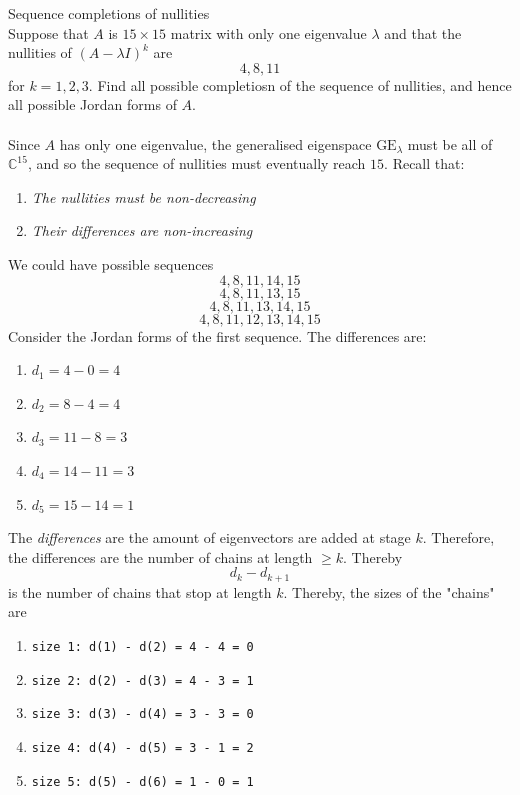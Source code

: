 \documentclass[journal, letterpaper]{IEEEtran}
\begin{document}
    \begin{myboxg}{Sequence completions of nullities} \\
        Suppose that $A$ is $15 \times 15$ matrix with only one eigenvalue $\lambda$ and that the nullities of $(A - \lambda I)^k$ are
        $$ 4, 8, 11$$
        for $k = 1, 2, 3$. Find all possible completiosn of the sequence of nullities, and hence all possible Jordan forms of $A$.
        \\ \\
        Since $A$ has only one eigenvalue, the generalised eigenspace $\text{GE}_\lambda$ must be all of $\mathbb{C}^{15}$, and so the sequence of nullities must eventually reach $15$. Recall that:
        \begin{enumerate}
            \item \textit{The nullities must be non-decreasing}
            \item \textit{Their differences are non-increasing}
        \end{enumerate}
        We could have possible sequences
        $$ 4, 8, 11, 14, 15$$
        $$ 4, 8, 11, 13, 15$$
        $$ 4, 8, 11, 13, 14, 15$$
        $$ 4, 8, 11, 12, 13, 14, 15$$
        Consider the Jordan forms of the first sequence. The differences are:
        \begin{enumerate}
            \item $d_1 = 4 - 0 = 4$
            \item $d_2 = 8 - 4 = 4$
            \item $d_3 = 11 - 8 = 3$
            \item $d_4 = 14 - 11 = 3$
            \item $d_5 = 15 - 14 = 1$
        \end{enumerate}
        The \textit{differences} are the amount of eigenvectors are added at stage $k$. Therefore,
        the differences are the number of chains at length $\ge k$. Thereby
        $$ d_k - d_{k + 1}$$
        is the number of chains that stop at length $k$. Thereby, the sizes of the "chains" are 
        \begin{enumerate}
            \item \verb|size 1: d(1) - d(2) = 4 - 4 = 0|
            \item \verb|size 2: d(2) - d(3) = 4 - 3 = 1|
            \item \verb|size 3: d(3) - d(4) = 3 - 3 = 0|
            \item \verb|size 4: d(4) - d(5) = 3 - 1 = 2|
            \item \verb|size 5: d(5) - d(6) = 1 - 0 = 1|

\end{enumerate}
\end{myboxg}
\end{document}
